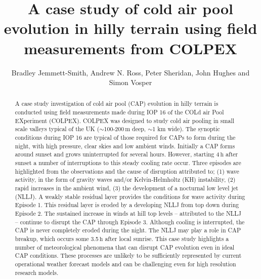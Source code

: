 \documentclass[times]{qjrms4}
\begin{document}

\title{A case study of cold air pool evolution in hilly terrain using field measurements from COLPEX}

\author{Bradley Jemmett-Smith\corrauth, Andrew N. Ross, Peter Sheridan, John Hughes and Simon Vosper}

\address{ University of Leeds, Leeds, UK  Met Office, Exeter, UK}


\begin{abstract}
A case study investigation of cold air pool (CAP) evolution in hilly terrain is conducted using field measurements made during IOP 16 of the COLd air Pool EXperiment (COLPEX). COLPEX was designed to study cold air pooling in small scale valleys typical of the UK ($\sim$100-200$\,\mbox{m}$ deep, $\sim$1 km wide). The synoptic conditions during IOP 16 are typical of those required for CAPs to form during the night, with high pressure, clear skies and low ambient winds. Initially a CAP forms around sunset and grows uninterrupted for several hours. However, starting 4$\,\mbox{h}$ after sunset a number of interruptions to this steady cooling rate occur. Three episodes are highlighted from the observations and the cause of disruption attributed to; (1) wave activity, in the form of gravity waves and/or Kelvin-Helmholtz (KH) instability, (2) rapid increases in the ambient wind, (3) the development of a nocturnal low level jet (NLLJ). A weakly stable residual layer provides the conditions for wave activity during Episode 1. This residual layer is eroded by a developing NLLJ from top down during Episode 2. The sustained increase in winds at hill top levels -- attributed to the NLLJ -- continue to disrupt the CAP through Episode 3. Although cooling is interrupted, the CAP is never completely eroded during the night. The NLLJ may play a role in CAP breakup, which occurs some 3.5$\,\mbox{h}$ after local sunrise. This case study highlights a number of meteorological phenomena that can disrupt CAP evolution even in ideal CAP conditions. These processes are unlikely to be sufficiently represented by current operational weather forecast models and can be challenging even for high resolution research models.
\end{abstract}
\end{document}
